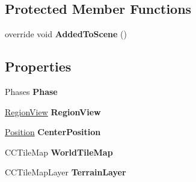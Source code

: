 \subsection*{Protected Member Functions}
\begin{DoxyCompactItemize}
\item 
\hypertarget{classClient_1_1Common_1_1Views_1_1WorldLayer_a4fefbd0db68b1ef20b134fb39ed340f9}{override void {\bfseries Added\-To\-Scene} ()}\label{classClient_1_1Common_1_1Views_1_1WorldLayer_a4fefbd0db68b1ef20b134fb39ed340f9}

\end{DoxyCompactItemize}
\subsection*{Properties}
\begin{DoxyCompactItemize}
\item 
\hypertarget{classClient_1_1Common_1_1Views_1_1WorldLayer_ae3646a0cc23442a3b7b96edfd673e6e1}{Phases {\bfseries Phase}}\label{classClient_1_1Common_1_1Views_1_1WorldLayer_ae3646a0cc23442a3b7b96edfd673e6e1}

\item 
\hypertarget{classClient_1_1Common_1_1Views_1_1WorldLayer_aad5e33a7256b817694809da2b7bd8e0c}{\hyperlink{classClient_1_1Common_1_1Views_1_1RegionView}{Region\-View} {\bfseries Region\-View}}\label{classClient_1_1Common_1_1Views_1_1WorldLayer_aad5e33a7256b817694809da2b7bd8e0c}

\item 
\hypertarget{classClient_1_1Common_1_1Views_1_1WorldLayer_afd03e15ab33d9374896b26f270b4ed49}{\hyperlink{classCore_1_1Models_1_1Position}{Position} {\bfseries Center\-Position}}\label{classClient_1_1Common_1_1Views_1_1WorldLayer_afd03e15ab33d9374896b26f270b4ed49}

\item 
\hypertarget{classClient_1_1Common_1_1Views_1_1WorldLayer_aba9b73da6c67f236c61b71ca42336414}{C\-C\-Tile\-Map {\bfseries World\-Tile\-Map}}\label{classClient_1_1Common_1_1Views_1_1WorldLayer_aba9b73da6c67f236c61b71ca42336414}

\item 
\hypertarget{classClient_1_1Common_1_1Views_1_1WorldLayer_a6720eb38ee9ed4cf9234f8f31ed8e928}{C\-C\-Tile\-Map\-Layer {\bfseries Terrain\-Layer}}\label{classClient_1_1Common_1_1Views_1_1WorldLayer_a6720eb38ee9ed4cf9234f8f31ed8e928}


\end{DoxyCompactItemize}
